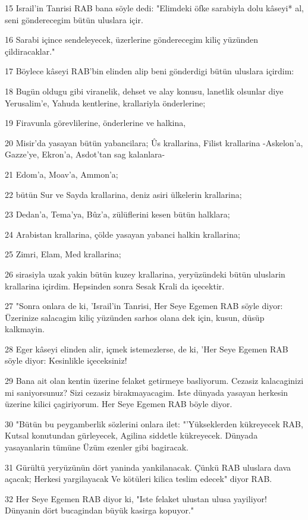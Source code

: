 \par 15 Israil'in Tanrisi RAB bana söyle dedi: "Elimdeki öfke sarabiyla dolu kâseyi* al, seni gönderecegim bütün uluslara içir.
\par 16 Sarabi içince sendeleyecek, üzerlerine gönderecegim kiliç yüzünden çildiracaklar."
\par 17 Böylece kâseyi RAB'bin elinden alip beni gönderdigi bütün uluslara içirdim:
\par 18 Bugün oldugu gibi viranelik, dehset ve alay konusu, lanetlik olsunlar diye Yerusalim'e, Yahuda kentlerine, krallariyla önderlerine;
\par 19 Firavunla görevlilerine, önderlerine ve halkina,
\par 20 Misir'da yasayan bütün yabancilara; Ûs krallarina, Filist krallarina -Askelon'a, Gazze'ye, Ekron'a, Asdot'tan sag kalanlara-
\par 21 Edom'a, Moav'a, Ammon'a;
\par 22 bütün Sur ve Sayda krallarina, deniz asiri ülkelerin krallarina;
\par 23 Dedan'a, Tema'ya, Bûz'a, zülüflerini kesen bütün halklara;
\par 24 Arabistan krallarina, çölde yasayan yabanci halkin krallarina;
\par 25 Zimri, Elam, Med krallarina;
\par 26 sirasiyla uzak yakin bütün kuzey krallarina, yeryüzündeki bütün uluslarin krallarina içirdim. Hepsinden sonra Sesak Krali da içecektir.
\par 27 "Sonra onlara de ki, 'Israil'in Tanrisi, Her Seye Egemen RAB söyle diyor: Üzerinize salacagim kiliç yüzünden sarhos olana dek için, kusun, düsüp kalkmayin.
\par 28 Eger kâseyi elinden alir, içmek istemezlerse, de ki, 'Her Seye Egemen RAB söyle diyor: Kesinlikle içeceksiniz!
\par 29 Bana ait olan kentin üzerine felaket getirmeye basliyorum. Cezasiz kalacaginizi mi saniyorsunuz? Sizi cezasiz birakmayacagim. Iste dünyada yasayan herkesin üzerine kilici çagiriyorum. Her Seye Egemen RAB böyle diyor.
\par 30 "Bütün bu peygamberlik sözlerini onlara ilet: "'Yükseklerden kükreyecek RAB, Kutsal konutundan gürleyecek, Agilina siddetle kükreyecek. Dünyada yasayanlarin tümüne Üzüm ezenler gibi bagiracak.
\par 31 Gürültü yeryüzünün dört yaninda yankilanacak. Çünkü RAB uluslara dava açacak; Herkesi yargilayacak Ve kötüleri kilica teslim edecek" diyor RAB.
\par 32 Her Seye Egemen RAB diyor ki, "Iste felaket ulustan ulusa yayiliyor! Dünyanin dört bucagindan büyük kasirga kopuyor."
